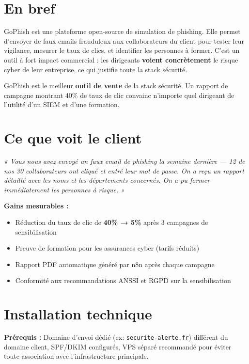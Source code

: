 \documentclass[11pt, a4paper]{article}
\begin{document}
\ficheHeader

\section*{En bref}
GoPhish est une plateforme open-source de simulation de phishing. Elle permet d'envoyer de faux emails frauduleux aux collaborateurs du client pour tester leur vigilance, mesurer le taux de clics, et identifier les personnes à former. C'est un outil à fort impact commercial : les dirigeants \textbf{voient concrètement} le risque cyber de leur entreprise, ce qui justifie toute la stack sécurité.

\begin{pointcle}
  GoPhish est le meilleur \textbf{outil de vente} de la stack sécurité. Un rapport de campagne montrant 40\% de taux de clic convainc n'importe quel dirigeant de l'utilité d'un SIEM et d'une formation.
\end{pointcle}

\section{Ce que voit le client}

\begin{clientbox}
  \textit{« Vous nous avez envoyé un faux email de phishing la semaine dernière — 12 de nos 30 collaborateurs ont cliqué et entré leur mot de passe. On a reçu un rapport détaillé avec les noms et les départements concernés. On a pu former immédiatement les personnes à risque. »}
\end{clientbox}

\textbf{Gains mesurables :}
\begin{itemize}
  \item Réduction du taux de clic de \textbf{40\% → 5\%} après 3 campagnes de sensibilisation
  \item Preuve de formation pour les assurances cyber (tarifs réduits)
  \item Rapport PDF automatique généré par n8n après chaque campagne
  \item Conformité aux recommandations ANSSI et RGPD sur la sensibilisation
\end{itemize}

\section{Installation technique}

\textbf{Prérequis :} Domaine d'envoi dédié (ex: \texttt{securite-alerte.fr}) différent du domaine client, SPF/DKIM configurés, VPS séparé recommandé pour éviter toute association avec l'infrastructure principale.
\end{document}
